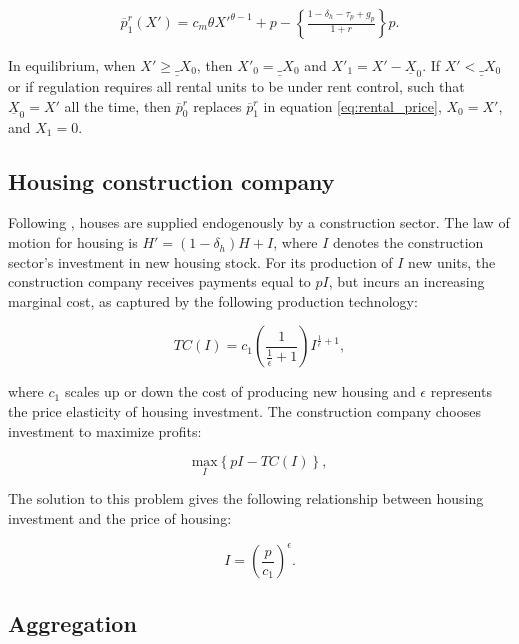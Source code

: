 \documentclass[parskip=full]{article}
\begin{document}
\begin{align}
\overline{p}^{r}_{1}(X')=c_{m}\theta X'^{\theta-1}+p-\left\{\frac{1-\delta_{h}-\tau_p+g_{p}}{1+r}\right\}p.\label{eq:rental_price}
\end{align}

\noindent In equilibrium, when $X'\geq \underline_{X}_{0}$, then $X'_{0}=\underline_{X}_{0}$ and $X'_{1}=X'-\underline{X}_{0}$. If $X'<\underline_{X}_{0}$ or if regulation requires all rental units to be under rent control, such that $\underline{X}_{0}=X'$ all the time, then $\overline{p}^{r}_{0}$ replaces $\overline{p}^{r}_{1}$ in equation \ref{eq:rental_price}, $X_{0}=X'$, and $X_{1}=0$.

\subsection{Housing construction company}

Following \citet{rotberg-2022}, houses are supplied endogenously by a construction sector. The law of motion for housing is $H'=(1-\delta_h)H + I$, where $I$ denotes the construction sector's investment in new housing stock. For its production of $I$ new units, the construction company receives payments equal to $pI$, but incurs an increasing marginal cost, as captured by the following production technology:

\begin{equation*}
TC(I)=c_{1}\left(\frac{1}{\frac{1}{\epsilon}+1}\right)I^{\frac{1}{\epsilon}+1}\label{eq:total_cost_structure},
\end{equation*}

\noindent where $c_1$ scales up or down the cost of producing new housing and $\epsilon$ represents the price elasticity of housing investment. The construction company chooses investment to maximize profits:

\begin{equation*}
\label{eq:construction_company_profits}
\underset{I} {\text{$\mbox{max} $}}{\left\{p I-TC(I)\right\}},
\end{equation*}

\noindent The solution to this problem gives the following relationship between housing investment and the price of housing:

\begin{equation}
\label{eq:construction_company_first_order_condition}
I=\left(\frac{p}{c_{1}}\right)^{\epsilon}.
\end{equation}

\subsection{Aggregation}\label{subsection:aggregation}
\end{document}
